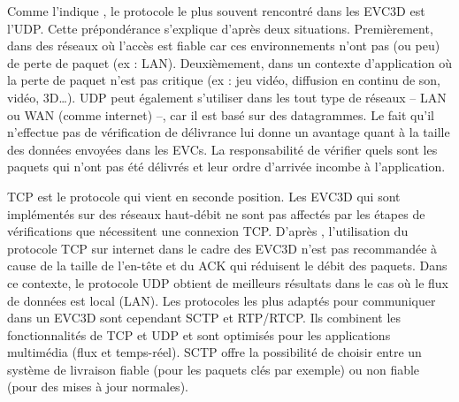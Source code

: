 Comme l'indique \cite{Roberto2014}, le protocole le plus souvent rencontré dans 
les \gls{EVC3D} est l'\gls{UDP}. 
Cette prépondérance s'explique d'après deux situations. Premièrement, dans des 
réseaux où l'accès est fiable car ces environnements n'ont 
pas (ou peu) de perte de paquet (ex : \gls{LAN}). Deuxièmement, dans un contexte 
d'application où la perte de paquet n'est pas critique (ex : jeu vidéo, diffusion en 
continu de son, vidéo, 3D\dots). 
\gls{UDP} peut également s'utiliser dans les tout type de réseaux -- \gls{LAN} ou 
\gls{WAN} (comme internet) --, car il est basé sur des datagrammes. Le fait qu'il 
n'effectue pas de vérification de délivrance lui donne un avantage quant 
à la taille des données envoyées dans les \glspl{EVC}. La responsabilité de 
vérifier quels sont les 
paquets qui n'ont pas été délivrés et leur ordre d'arrivée incombe à l'application.

\gls{TCP} est le protocole qui vient en seconde position. Les \gls{EVC3D} qui sont 
implémentés sur des réseaux haut-débit ne sont pas affectés par les étapes de 
vérifications que nécessitent une connexion \gls{TCP}. D'après \cite{Sung2006}, 
l'utilisation du protocole \gls{TCP} sur internet dans le cadre des \gls{EVC3D} n'est 
pas recommandée à cause de la taille de l'en-tête et du ACK qui réduisent le débit 
des paquets.
Dans ce contexte, le protocole \gls{UDP} obtient de meilleurs résultats dans le cas 
où le flux de données est local (\gls{LAN}). 
Les protocoles les plus adaptés pour communiquer dans un \gls{EVC3D} sont 
cependant \acrshort{SCTP} et \gls{RTP}/\gls{RTCP}. Ils combinent les 
fonctionnalités de 
\gls{TCP} et \gls{UDP} et sont optimisés pour les applications multimédia (flux et 
temps-réel). \gls{SCTP} offre la possibilité de choisir entre un système de 
livraison fiable (pour les paquets clés par exemple) ou non fiable (pour des mises 
à jour normales).


